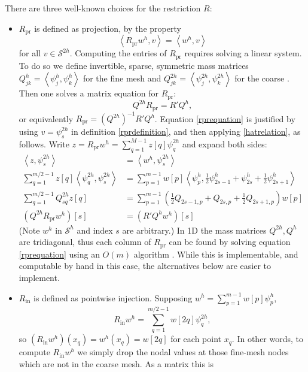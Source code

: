 \documentclass[letterpaper,final,12pt,reqno]{amsart}
\newcommand{\ip}[2]{\left<#1,#2\right>}
\newcommand{\Rpr}{R_{\text{pr}}}
\newcommand{\Rin}{R_{\text{in}}}
\begin{document}
There are three well-known choices for the restriction $R$:
\begin{itemize}
\item $\Rpr$ is defined as projection, by the property
\begin{equation}
  \ip{\Rpr w^h}{v} = \ip{w^h}{v} \label{rprdefinition}
\end{equation}
for all $v\in \mathcal{S}^{2h}$.  Computing the entries of $\Rpr$ requires solving a linear system.  To do so we define invertible, sparse, symmetric mass matrices $Q_{jk}^{h} = \ip{\psi_j^{h}}{\psi_k^{h}}$ for the fine mesh and $Q_{jk}^{2h} = \ip{\psi_j^{2h}}{\psi_k^{2h}}$ for the coarse \cite{Elmanetal2014}.  Then one solves a matrix equation for $\Rpr$:
\begin{equation}
  Q^{2h} \Rpr = R' Q^{h},  \label{rprequation}
\end{equation}
or equivalently $\Rpr = (Q^{2h})^{-1} R' Q^{h}$.  Equation \eqref{rprequation} is justified by using $v=\psi_s^{2h}$ in definition \eqref{rprdefinition}, and then applying \eqref{hatrelation}, as follows.  Write $z = \Rpr w^h = \sum_{q=1}^{M-1} z[q] \psi_q^{2h}$ and expand both sides:
\begin{align*}
\ip{z}{\psi_s^{2h}} &= \ip{w^h}{\psi_s^{2h}} \\
\sum_{q=1}^{m/2-1} z[q] \ip{\psi_q^{2h}}{\psi_s^{2h}} &= \sum_{p=1}^{m-1} w[p] \ip{\psi_p^{h}}{\frac{1}{2} \psi_{2s-1}^{h} + \psi_{2s}^{h} + \frac{1}{2} \psi_{2s+1}^{h}} \\
\sum_{q=1}^{m/2-1} Q_{sq}^{2h} z[q] &= \sum_{p=1}^{m-1} \left(\frac{1}{2} Q_{2s-1,p} + Q_{2s,p} + \frac{1}{2} Q_{2s+1,p}\right) w[p] \\
(Q^{2h} \Rpr w^h)[s] &= (R' Q^h w^h)[s]
\end{align*}
(Note $w^h$ in $\mathcal{S}^h$ and index $s$ are arbitrary.)  In 1D the mass matrices $Q^{2h},Q^h$ are tridiagonal, thus each column of $\Rpr$ can be found by solving equation \eqref{rprequation} using an $O(m)$ algorithm \cite{TrefethenBau1997}.  While this is implementable, and computable by hand in this case, the alternatives below are easier to implement.
\item $\Rin$ is defined as pointwise injection.  Supposing $w^h = \sum_{p=1}^{m-1} w[p] \psi_p^{h}$,
\begin{equation}
  \Rin w^h = \sum_{q=1}^{m/2-1} w[2q] \psi_q^{2h}, \label{rindefinition}
\end{equation}
so $(\Rin w^h)(x_q) = w^h(x_q) = w[2q]$ for each point $x_q$.  In other words, to compute $\Rin w^h$ we simply drop the nodal values at those fine-mesh nodes which are not in the coarse mesh.  As a matrix this is

\end{itemize}
\end{document}
